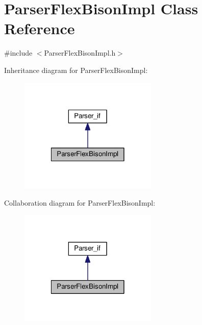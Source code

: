 \hypertarget{class_parser_flex_bison_impl}{\section{Parser\-Flex\-Bison\-Impl Class Reference}
\label{class_parser_flex_bison_impl}
}


{\ttfamily \#include $<$Parser\-Flex\-Bison\-Impl.\-h$>$}



Inheritance diagram for Parser\-Flex\-Bison\-Impl\-:
\nopagebreak
\begin{figure}[H]
\begin{center}
\leavevmode
\includegraphics[width=186pt]{class_parser_flex_bison_impl__inherit__graph}
\end{center}
\end{figure}


Collaboration diagram for Parser\-Flex\-Bison\-Impl\-:
\nopagebreak
\begin{figure}[H]
\begin{center}
\leavevmode
\includegraphics[width=186pt]{class_parser_flex_bison_impl__coll__graph}
\end{center}
\end{figure}
